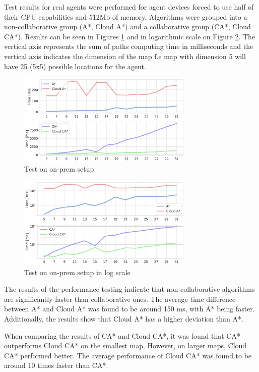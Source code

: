 Test results for real agents were performed for agent devices forced to use half of their CPU capabilities and 512Mb of memory. Algorithms were grouped into a non-collaborative group (A*, Cloud A*) and a collaborative group (CA*, Cloud CA*). Results can be seen in Figures \ref{fig:on_prem_test_time} and in logarithmic scale on Figure \ref{fig:on_prem_test_time_log}. The vertical axis represents the sum of paths computing time in milliseconds and the vertical axis indicates the dimension of the map f.e map with dimension 5 will have 25 (5x5) possible locations for the agent.

\begin{figure}[H]
    \centering
    \includegraphics[width=0.75\textwidth]{pictures/on_prem_test_time.png}
    \caption{Test on on-prem setup}
    \label{fig:on_prem_test_time}
\end{figure}
\begin{figure}[H]
    \centering
    \includegraphics[width=0.75\textwidth]{pictures/on_prem_test_time_log.png}
    \caption{Test on on-prem setup in log scale}
    \label{fig:on_prem_test_time_log}
\end{figure}

The results of the performance testing indicate that non-collaborative algorithms are significantly faster than collaborative ones. The average time difference between A* and Cloud A* was found to be around 150 ms, with A* being faster. Additionally, the results show that Cloud A* has a higher deviation than A*.

When comparing the results of CA* and Cloud CA*, it was found that CA* outperforms Cloud CA* on the smallest map. However, on larger maps, Cloud CA* performed better. The average performance of Cloud CA* was found to be around 10 times faster than CA*.